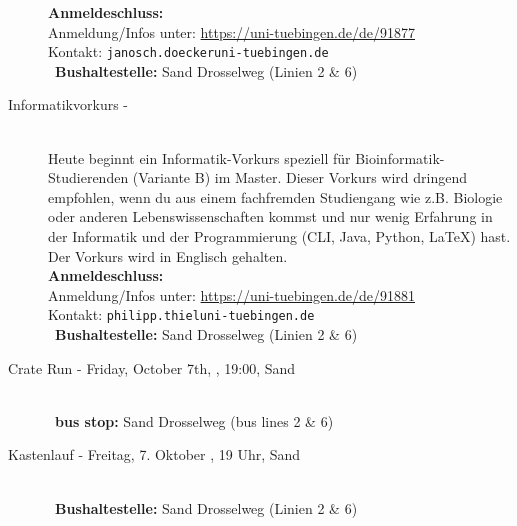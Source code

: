 \begin{description}
	\textbf{Anmeldeschluss:} \matheanmeldung\YEAR\\
	Anmeldung/Infos unter:  \url{https://uni-tuebingen.de/de/91877}\\
	Kontakt: \texttt{janosch.doecker\At uni-tuebingen.de}\\
	\ifsommersemester
	~\textbf{Bushaltestelle:} Sand Drosselweg (Linien 2 \& 6) 
	\fi
\fi

\ifmaster
    \ifbinfo
        \item[Informatikvorkurs - \bioinfoDatum~\YEAR]\ \\
            Heute beginnt ein Informatik-Vorkurs speziell für Bioinformatik-Studierenden (Variante B) im Master. Dieser Vorkurs wird dringend empfohlen, wenn du aus einem fachfremden Studiengang wie z.B. Biologie oder anderen Lebenswissenschaften kommst und nur wenig Erfahrung in der Informatik und der Programmierung (CLI, Java, Python, \LaTeX) hast. Der Vorkurs wird in Englisch gehalten. \\
            \textbf{Anmeldeschluss:} \bioinfoAnmeldung\YEAR\\
            Anmeldung/Infos unter: \url{https://uni-tuebingen.de/de/91881}\\
            Kontakt: \texttt{philipp.thiel\At uni-tuebingen.de}\\
        ~\textbf{Bushaltestelle:} Sand Drosselweg (Linien 2 \& 6)
    \fi
\fi


\ifml
	\item[Crate Run - Friday, October 7th, \YEAR, 19:00, Sand]~\\
	~\textbf{bus stop:} Sand Drosselweg (bus lines 2 \& 6)
\else
	\item[Kastenlauf - Freitag, 7. Oktober \YEAR, 19 Uhr, Sand]~\\

	~\textbf{Bushaltestelle:} Sand Drosselweg (Linien 2 \& 6)
\fi



\end{description}
